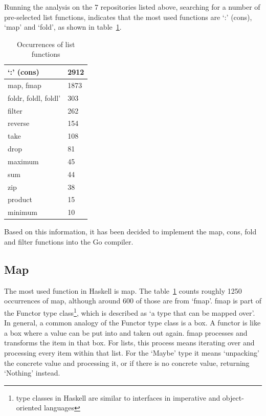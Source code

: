 Running the analysis on the 7 repositories listed above, searching for a number
of pre-selected list functions, indicates that the most used functions are `:'
(cons), `map' and `fold', as shown in table~\ref{tab:occurrences-list-funcs}.

\begin{table}[htb]
\centering
\begin{tabular}{ll}
\toprule
`:' (cons) & 2912 \\
\midrule
map, fmap & 1873 \\
\midrule
foldr, foldl, foldl' & 303 \\
\midrule
filter & 262 \\
\midrule
reverse & 154 \\
\midrule
take & 108 \\
\midrule
drop & 81 \\
\midrule
maximum & 45 \\
\midrule
sum & 44 \\
\midrule
zip & 38 \\
\midrule
product & 15 \\
\midrule
minimum & 10 \\
\end{tabular}
\caption[Occurrences of list functions]{Occurrences of list functions\footnotemark}
\label{tab:occurrences-list-funcs}
\end{table}


Based on this information, it has been decided to implement the map, cons, fold
and filter functions into the Go compiler.

\subsection{Map}

The most used function in Haskell is map. The table~\ref{tab:occurrences-list-funcs}
counts roughly 1250 occurrences of map, although around 600 of those are from `fmap'.
fmap is part of the Functor type class\footnote{type classes
    in Haskell are similar to interfaces in imperative and object-oriented
languages}, which is described as `a type that can be mapped over'\autocite{functor-wiki}.
In general, a common analogy of the Functor type class is a box. A functor is like a box
where a value can be put into and taken out again. fmap processes and transforms the item
in that box. For lists, this process means iterating over and processing every item within that list.
For the `Maybe' type it means `unpacking' the concrete value and processing it, or if there is
no concrete value, returning `Nothing' instead.

